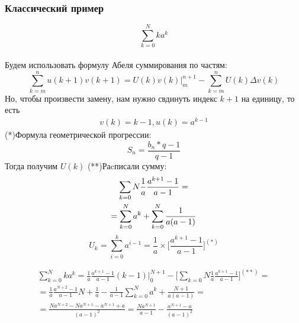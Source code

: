 \documentclass[a4paper,11pt]{article}
\begin{document}
  \subsubsection{Классический пример}
    \[\sum_{k=0}^N ka^k\] \\
    Будем использовать формулу Абеля суммирования по частям: \\
    \[\sum_{k=m}^{n} u(k+1) v(k+1) = U(k) v(k) \bigg|_{m}^{n+1} - \sum_{k=m}^{n} U(k) \Delta v(k)\]
    Но, чтобы произвести замену, нам нужно свдинуть индекс $k+1$ на единицу, то есть \\
    \begin{equation*}
      \begin{split}
      v(k) = k - 1,
      u(k) = a^{k-1}
      \end{split}
    \end{equation*}
    \marginpar
    {
      \footnotesize (*)Формула геометрической прогрессии:
      \footnotesize \[S_n = \frac{b_n*q-1}{q-1}\]
    }
    Тогда получим $U(k)$
    \marginpar
    {
      \footnotesize (**)Раcписали сумму:
      \begin{gather*}
        \footnotesize \sum_{k=0}{N} \frac{1}{a} \frac{a^{k+1}-1}{a-1} = \\
        = \sum_{k=0}^{N}a^k + \sum_{k=0}^{N}\frac{1}{a(a-1)}
      \end{gather*}
    }
    \[U_k = \sum_{i=0}^{k}a^{i-1} = \frac{1}{a} \times \bigg[ \frac{a^{k+1}-1}{a-1} \bigg]^{(*)}\]

    \begin{equation*}
      \begin{split}
        \sum_{k=0}^{N}ka^k = \frac{1}{a} \frac{a^{k+1}-1}{a-1}(k-1) \bigg|_{0}^{N+1} - \bigg[\sum_{k=0}{N} \frac{1}{a} \frac{a^{k+1}-1}{a-1} \bigg]^{(**)} = \\
        = \frac{1}{a} \frac{a^{N+2}-1}{a-1}N + \frac{1}{a} - \frac{1}{a-1} \sum_{k=0}^{N}a^k + \frac{N+1}{a(a-1)} = \\
        = \frac{Na^{N+2} - Na^{N+1} - a^{N+1} + a}{(a-1)^2}
        = \frac{Na^{N+1}}{a-1} - \frac{a^{N+1} - a}{(a-1)^2}
      \end{split}
    \end{equation*}
\end{document}
